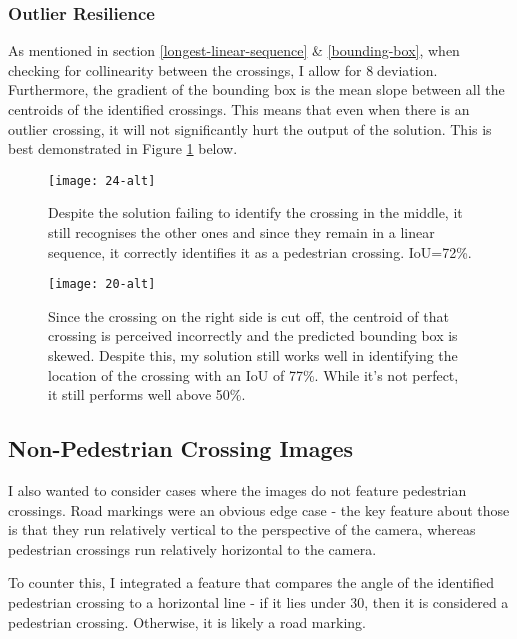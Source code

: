 \documentclass{article}  %
\begin{document}
	\subsubsection{Outlier Resilience}
	
	As mentioned in section \ref{longest-linear-sequence} \& \ref{bounding-box}, when checking for collinearity between the crossings, I allow for 8\textdegree $\;$deviation. Furthermore, the gradient of the bounding box is the mean slope between all the centroids of the identified crossings. This means that even when there is an outlier crossing, it will not significantly hurt the output of the solution. This is best demonstrated in Figure \ref{outlier-image} below.
	
	\begin{figure}[H]
		\begin{minipage}[c]{0.45\linewidth}
			\centering
			\texttt{[image: 24-alt]}
			\caption{Despite the solution failing to identify the crossing in the middle, it still recognises the other ones and since they remain in a linear sequence, it correctly identifies it as a pedestrian crossing. IoU=72\%.}
		\end{minipage}\hfill
		\begin{minipage}[c]{0.45\linewidth}
			\centering
			\texttt{[image: 20-alt]}
			\caption{Since the crossing on the right side is cut off, the centroid of that crossing is perceived incorrectly and the predicted bounding box is skewed. Despite this, my solution still works well in identifying the location of the crossing with an IoU of 77\%. While it's not perfect, it still performs well above 50\%.}
			\label{outlier-image}
		\end{minipage}
	\end{figure}
	
	\subsection{Non-Pedestrian Crossing Images}
	
	I also wanted to consider cases where the images do not feature pedestrian crossings. Road markings were an obvious edge case - the key feature about those is that they run relatively vertical to the perspective of the camera, whereas pedestrian crossings run relatively horizontal to the camera.
	
	To counter this, I integrated a feature that compares the angle of the identified pedestrian crossing to a horizontal line - if it lies under 30\textdegree , then it is considered a pedestrian crossing. Otherwise, it is likely a road marking.
	
\end{document}
